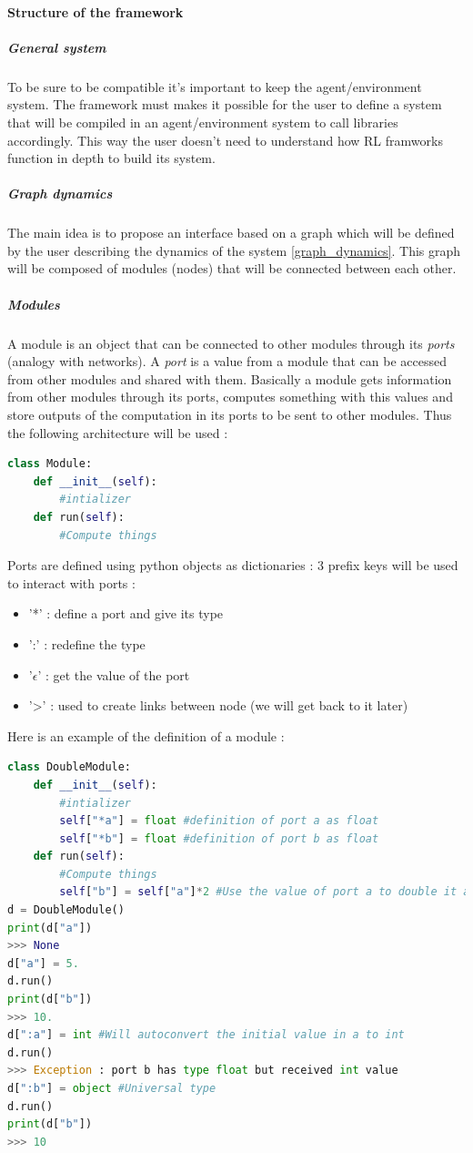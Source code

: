 \documentclass[11pt]{article}
\begin{document}
\paragraph{Structure of the framework}
\subparagraph{General system}
To be sure to be compatible it's important to keep the agent/environment system. The framework must makes it possible for the user to define a system that will be compiled in an agent/environment system to call libraries accordingly. This way the user doesn't need to understand how RL framworks function in depth to build its system.
\subparagraph{Graph dynamics}
The main idea is to propose an interface based on a graph which will be defined by the user describing the dynamics of the system \ref{graph_dynamics}. This graph will be composed of modules (nodes) that will be connected between each other.
\subparagraph{Modules}
A module is an object that can be connected to other modules through its \emph{ports} (analogy with networks). A \emph{port} is a value from a module that can be accessed from other modules and shared with them. Basically a module gets information from other modules through its ports, computes something with this values and  store outputs of the computation in its ports to be sent to other modules. Thus the following architecture will be used :
\begin{lstlisting}[language=Python]
class Module:
	def __init__(self):
		#intializer
	def run(self):
		#Compute things
\end{lstlisting}
Ports are defined using python objects as dictionaries : 3 prefix keys will be used to interact with ports :
\begin{itemize}
\item '*' : define a port and give its type
\item ':' : redefine the type
\item '$\epsilon$' : get the value of the port
\item '>' : used to create links between node (we will get back to it later)
\end{itemize}
Here is an example of the definition of a module :
\begin{lstlisting}[language=Python]
class DoubleModule:
	def __init__(self):
		#intializer
		self["*a"] = float #definition of port a as float
		self["*b"] = float #definition of port b as float
	def run(self):
		#Compute things
		self["b"] = self["a"]*2 #Use the value of port a to double it and put it in port b
d = DoubleModule()
print(d["a"])
>>> None
d["a"] = 5.
d.run()
print(d["b"])
>>> 10.
d[":a"] = int #Will autoconvert the initial value in a to int
d.run()
>>> Exception : port b has type float but received int value
d[":b"] = object #Universal type
d.run()
print(d["b"])
>>> 10
\end{lstlisting}
\end{document}
